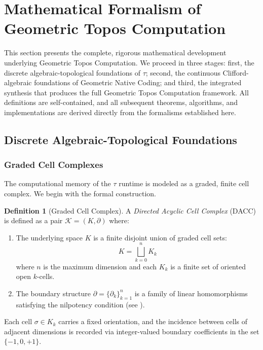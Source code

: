 \documentclass[manuscript, nonacm, review=false]{acmart}
\theoremstyle{definition}
\newtheorem{definition}{Definition}[section]
\theoremstyle{plain}
\newcommand{\K}{\mathcal{K}}
\newcommand{\toposLang}{\ensuremath{\tau}\text{-Lang}}
\begin{document}
\section{Mathematical Formalism of Geometric Topos Computation}
\label{sec:formalism}

This section presents the complete, rigorous mathematical development underlying Geometric Topos Computation. We proceed in three stages: first, the discrete algebraic-topological foundations of \toposLang{}; second, the continuous Clifford-algebraic foundations of Geometric Native Coding; and third, the integrated synthesis that produces the full Geometric Topos Computation framework. All definitions are self-contained, and all subsequent theorems, algorithms, and implementations are derived directly from the formalisms established here.

\subsection{Discrete Algebraic-Topological Foundations}
\label{subsec:discrete_foundations}

\subsubsection{Graded Cell Complexes}

The computational memory of the \toposLang{} runtime is modeled as a graded, finite cell complex. We begin with the formal construction.

\begin{definition}[Graded Cell Complex]
\label{def:graded_complex}
A \emph{Directed Acyclic Cell Complex} (DACC) is defined as a pair $\K = (K, \partial)$ where:
\begin{enumerate}[label=(\roman*)]
    \item The underlying space $K$ is a finite disjoint union of graded cell sets:
    \begin{equation}
        K = \bigsqcup_{k=0}^{n} K_k
    \end{equation}
    where $n$ is the maximum dimension and each $K_k$ is a finite set of oriented open $k$-cells.
    
    \item The boundary structure $\partial = \{\partial_k\}_{k=1}^{n}$ is a family of linear homomorphisms satisfying the nilpotency condition (see ).
\end{enumerate}
Each cell $\sigma \in K_k$ carries a fixed orientation, and the incidence between cells of adjacent dimensions is recorded via integer-valued boundary coefficients in the set $\{-1, 0, +1\}$.
\end{definition}
\end{document}
